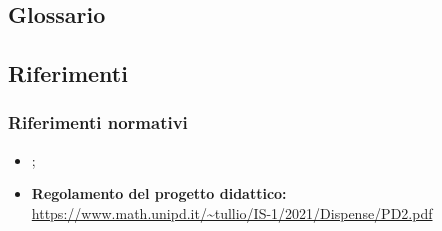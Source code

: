 \subsection{Glossario}\label{subsection:glossario}
\gloDesc{}

\subsection{Riferimenti}\label{subsection:riferimenti}
\subsubsection{Riferimenti normativi}\label{subsubsection:riferimenti_normativi}
\begin{itemize}
  \item \textbf{\docNameVersionNdP{}};
  \item \textbf{Regolamento del progetto didattico:}\\\url{https://www.math.unipd.it/~tullio/IS-1/2021/Dispense/PD2.pdf}
\end{itemize}

